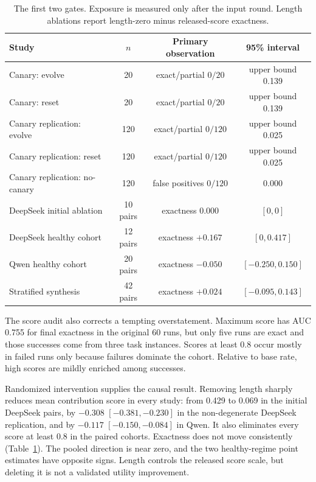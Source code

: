 \documentclass{article}
\begin{document}
\begin{table}[t]
\caption{The first two gates. Exposure is measured only after the input round. Length ablations report length-zero minus released-score exactness.}
\label{tab:audit}
\centering
\small
\begin{tabular}{lccc}
\toprule
Study & $n$ & Primary observation & 95\% interval \\
\midrule
Canary: evolve & 20 & exact/partial $0/20$ & upper bound 0.139 \\
Canary: reset & 20 & exact/partial $0/20$ & upper bound 0.139 \\
Canary replication: evolve & 120 & exact/partial $0/120$ & upper bound 0.025 \\
Canary replication: reset & 120 & exact/partial $0/120$ & upper bound 0.025 \\
Canary replication: no-canary & 120 & false positives $0/120$ & 0.000 \\
DeepSeek initial ablation & 10 pairs & exactness $0.000$ & $[0,0]$ \\
DeepSeek healthy cohort & 12 pairs & exactness $+0.167$ & $[0,0.417]$ \\
Qwen healthy cohort & 20 pairs & exactness $-0.050$ & $[-0.250,0.150]$ \\
Stratified synthesis & 42 pairs & exactness $+0.024$ & $[-0.095,0.143]$ \\
\bottomrule
\end{tabular}
\end{table}

The score audit also corrects a tempting overstatement. Maximum score has AUC 0.755 for final exactness in the original 60 runs, but only five runs are exact and those successes come from three task instances. Scores at least 0.8 occur mostly in failed runs only because failures dominate the cohort. Relative to base rate, high scores are mildly enriched among successes.

Randomized intervention supplies the causal result. Removing length sharply reduces mean contribution score in every study: from 0.429 to 0.069 in the initial DeepSeek pairs, by $-0.308$ $[-0.381,-0.230]$ in the non-degenerate DeepSeek replication, and by $-0.117$ $[-0.150,-0.084]$ in Qwen. It also eliminates every score at least 0.8 in the paired cohorts. Exactness does not move consistently (Table~\ref{tab:audit}). The pooled direction is near zero, and the two healthy-regime point estimates have opposite signs. Length controls the released score scale, but deleting it is not a validated utility improvement.
\end{document}
